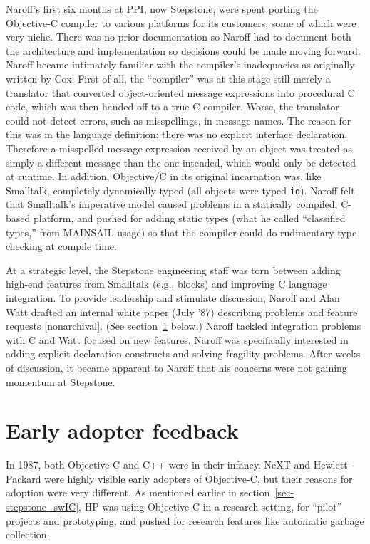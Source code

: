 \documentclass[acmsmall]{acmart}\settopmatter{}
\begin{document}
Naroff's first six months at PPI, now Stepstone, were spent porting the Objective-C compiler to various platforms for its customers, some of which were very niche. There was no prior documentation so Naroff had to document both the architecture and implementation so decisions could be made moving forward. Naroff became intimately familiar with the compiler's inadequacies as originally written by Cox. First of all, the ``compiler'' was at this stage still merely a translator that converted object-oriented message expressions into procedural C code, which was then handed off to a true C compiler. Worse, the translator could not detect errors, such as misspellings, in message names. The reason for this was in the language definition: there was no explicit interface declaration. Therefore a misspelled message expression received by an object was treated as simply a different message than the one intended, which would only be detected at runtime. In addition, Objective\=/C in its original incarnation was, like Smalltalk, completely dynamically typed (all objects were typed \verb$id$). Naroff felt that Smalltalk's imperative model caused problems in a statically compiled, C-based platform, and pushed for adding static types (what he called ``classified types,'' from MAINSAIL usage) so that the compiler could do rudimentary type-checking at compile time.

At a strategic level, the Stepstone engineering staff was torn between adding high-end features from Smalltalk (e.g., blocks) and improving C language integration. To provide leadership and stimulate discussion, Naroff and Alan Watt drafted an internal white paper (July '87) describing problems and feature requests \citep{naroff_design_1987}[nonarchival]. (See section~\ref{sec-earlyadopterfeedback} below.) Naroff tackled integration problems with C and Watt focused on new features. Naroff was specifically interested in adding explicit declaration constructs and solving fragility problems. After weeks of discussion, it became apparent to Naroff that his concerns were not gaining momentum at Stepstone. 
\section{Early adopter feedback}
\label{sec-earlyadopterfeedback}
In 1987, both Objective-C and C++ were in their infancy. NeXT and Hewlett-Packard were highly visible early adopters of Objective-C, but their reasons for adoption were very different. As mentioned earlier in section~\ref{sec-stepstone_swIC}, HP was using Objective-C in a research setting, for ``pilot'' projects and prototyping, and pushed for research features like automatic garbage collection.
\end{document}
